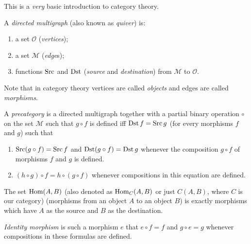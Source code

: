 This is a \emph{very} basic introduction to category theory.
\begin{defn}
A \emph{directed multigraph} (also known
as \emph{quiver}) is:
\begin{enumerate}
\item {}a set $\mathcal{O}$ (\emph{vertices});
\item {}a set $\mathcal{M}$ (\emph{edge}s);
\item {}functions $\operatorname{Src}$ and $\operatorname{Dst}$ (\emph{source}
and \emph{destination}) from $\mathcal{M}$ to $\mathcal{O}$.
\end{enumerate}
\end{defn}
Note that in category theory vertices
are called \emph{objects} and edges are called \emph{morphisms}.
\begin{defn}
A \emph{precategory} is a directed multigraph
together with a partial binary operation $\circ$ on the set $\mathcal{M}$
such that $g\circ f$ is defined iff $\operatorname{Dst} f=\operatorname{Src} g$ (for every morphisms
$f$ and $g$) such that
\begin{enumerate}
\item $\operatorname{Src}(g\circ f)=\operatorname{Src} f$ and $\operatorname{Dst}(g\circ f)=\operatorname{Dst} g$ whenever the
composition $g\circ f$ of morphisms $f$ and $g$ is defined.
\item $(h\circ g)\circ f=h\circ(g\circ f)$ whenever compositions in this
equation are defined.
\end{enumerate}
\end{defn}

\begin{defn}
The set $\operatorname{Hom}(A,B)$ (also denoted as $\operatorname{Hom}_{C}(A,B)$ or just $C(A,B)$,
where $C$ is our category) (morphisms from an object $A$ to an object
$B$) is exactly morphisms which have $A$ as the source and $B$
as the destination.
\end{defn}

\begin{defn}
\emph{Identity morphism} is such a morphism
$e$ that $e\circ f=f$ and $g\circ e=g$ whenever compositions in
these formulas are defined.
\end{defn}


